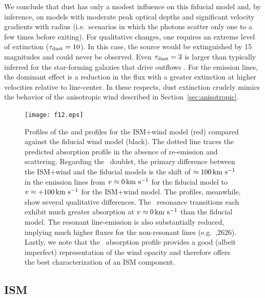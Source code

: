 \documentclass[]{emulateapj}
\begin{document}
We conclude that dust has only a modest influence on this fiducial model and,
by inference, on models with moderate peak optical depths and
significant velocity gradients with radius (i.e.\ scenarios in which the
photons scatter only one to a few times before exiting).
For qualitative changes, one requires an extreme level of
extinction ($\tau_{\rm dust} = 10$).  In this case, the source would be
extinguished by 15\,magnitudes and could never be observed. 
Even $\tau_{\rm dust} = 3$ is larger than typically inferred for the
star-forming galaxies that drive outflows \citep[e.g.][]{cf00}.
For the emission lines,
the dominant effect is a reduction in the flux 
with a greater extinction at higher velocities relative to line-center.
In these respects, dust extinction crudely mimics the behavior of the
anisotropic
wind described in Section~\ref{sec:anisotropic}. 

\begin{figure}
\texttt{[image: f12.eps]}
\caption{
Profiles of the  and  profiles for the ISM+wind
model (red) compared against the fiducial wind model (black). 
The dotted line traces the predicted absorption profile in the absence
of re-emission and scattering.
Regarding the ~doublet, the primary difference between the
ISM+wind and the fiducial models is the shift of $\approx 100 \, {\rm km~s^{-1}}$
in the emission lines from $v \approx 0 \, {\rm km~s^{-1}}$ for the fiducial
model to $v \approx +100\, {\rm km~s^{-1}}$ for the ISM+wind model. 
The  profiles, meanwhile, show several qualitative differences. 
The \feiid\ resonance transitions each exhibit much
greater absorption at $v \approx 0 \, {\rm km~s^{-1}}$ than the fiducial model.
The resonant line-emission is also substantially
reduced, implying much higher fluxes for the non-resonant lines (e.g.\
\feiic,2626).  
Lastly, we note that the \feiia\ absorption profile provides a good
(albeit imperfect) representation of the wind opacity and therefore
offers the best characterization of an ISM component.
}
\label{fig:ISM_spec}
\end{figure}


\subsection{ISM}
\label{sec:ISM}
\end{document}

